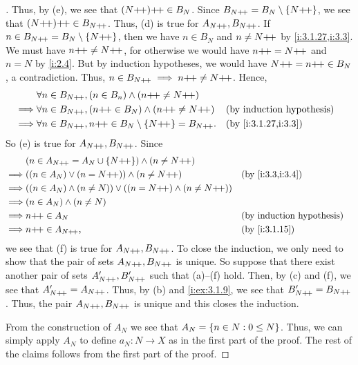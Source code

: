 \begin{proof}[]
  Thus, by (e), we see that \((N{+}\!{+}){+}\!{+} \in B_N\).
  Since \(B_{N{+}\!{+}} = B_N \setminus \left\lbrace N{+}\!{+}\right\rbrace\), we see that \((N{+}\!{+}){+}\!{+} \in B_{N{+}\!{+}}\).
  Thus, (d) is true for \(A_{N{+}\!{+}}, B_{N{+}\!{+}}\).
  If \(n \in B_{N{+}\!{+}} = B_N \setminus \left\lbrace N{+}\!{+}\right\rbrace\), then we have \(n \in B_N\) and \(n \neq N{+}\!{+}\) by \cref{i:3.1.27,i:3.3}.
  We must have \(n{+}\!{+} \neq N{+}\!{+}\), for otherwise we would have \(n{+}\!{+} = N{+}\!{+}\) and \(n = N\) by \cref{i:2.4}.
  But by induction hypotheses, we would have \(N{+}\!{+} = n{+}\!{+} \in B_N\), a contradiction.
  Thus, \(n \in B_{N{+}\!{+}} \implies n{+}\!{+} \neq N{+}\!{+}\).
  Hence,
  \begin{align*}
             & \forall n \in B_{N\pp}, (n \in B_n) \land (n\pp \neq N\pp)                                     \\
    \implies & \forall n \in B_{N\pp}, (n\pp \in B_N) \land (n\pp \neq N\pp)         &  & \byIH               \\
    \implies & \forall n \in B_{N\pp}, n\pp \in B_N \setminus \set{N\pp} = B_{N\pp}. &  & \by{i:3.1.27,i:3.3}
  \end{align*}
  So (e) is true for \(A_{N{+}\!{+}}, B_{N{+}\!{+}}\).
  Since
  \begin{align*}
             & (n \in A_{N\pp} = A_N \cup \set{N\pp}) \land (n \neq N\pp)                                 \\
    \implies & ((n \in A_N) \lor (n = N\pp)) \land (n \neq N\pp)                    &  & \by{i:3.3,i:3.4} \\
    \implies & ((n \in A_N) \land (n \neq N)) \lor ((n = N\pp) \land (n \neq N\pp))                       \\
    \implies & (n \in A_N) \land (n \neq N)                                                               \\
    \implies & n\pp \in A_N                                                         &  & \byIH            \\
    \implies & n\pp \in A_{N\pp},                                                   &  & \by{i:3.1.15}
  \end{align*}
  we see that (f) is true for \(A_{N{+}\!{+}}, B_{N{+}\!{+}}\).
  To close the induction, we only need to show that the pair of sets \(A_{N{+}\!{+}}, B_{N{+}\!{+}}\) is unique.
  So suppose that there exist another pair of sets \(A_{N{+}\!{+}}', B_{N{+}\!{+}}'\) such that (a)--(f) hold.
  Then, by (c) and (f), we see that \(A_{N{+}\!{+}}' = A_{N{+}\!{+}}\).
  Thus, by (b) and \cref{i:ex:3.1.9}, we see that \(B_{N{+}\!{+}}' = B_{N{+}\!{+}}\).
  Thus, the pair \(A_{N{+}\!{+}}, B_{N{+}\!{+}}\) is unique and this closes the induction.

  From the construction of \(A_N\) we see that \(A_N = \left\lbrace n \in N : 0 \leq N\right\rbrace\).
  Thus, we can simply apply \(A_N\) to define \(a_N : N \to X\) as in the first part of the proof.
  The rest of the claims follows from the first part of the proof.
\end{proof}

